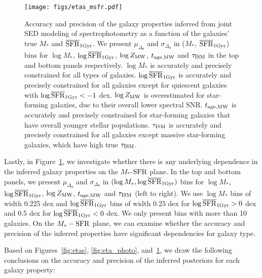 \begin{figure}
\begin{center}
    \texttt{[image: figs/etas\_msfr.pdf]} 
    \caption{
        Accuracy and precision of the galaxy properties inferred from joint SED
        modeling of spectrophotometry as a function of the galaxies' true $M_*$
        and $\overline{\rm SFR}_{\rm 1Gyr}$. 
        We present $\mu_{\Delta_{\theta}}$ and $\sigma_{\Delta_{\theta}}$ in
        ($M_*$, $\overline{\rm SFR}_{\rm 1Gyr}$) bins for $\log M_*$, $\log\overline{\rm SFR}_{\rm 1Gyr}$, $\log Z_{\rm
        MW}$, $t_{\rm age, MW}$ and $\tau_{\rm ISM}$ in the top and bottom
        panels respectively. 
        $\log M_*$ is accurately and precisely constrained for all types of galaxies. 
        $\log\overline{\rm SFR}_{\rm 1Gyr}$ is accurately and precisely constrained for all galaxies
        except for quiescent galaxies with $\log\overline{\rm SFR}_{\rm 1Gyr} < -1$ dex. 
        $\log Z_{\rm MW}$ is overestimated for star-forming galaxies, due to their
        overall lower spectral SNR. 
        $t_{\rm age, MW}$ is accurately and precisely constrained for star-forming
        galaxies that have overall younger stellar populations. 
        $\tau_{\rm ISM}$ is accurately and precisely constrained for all galaxies
        except massive star-forming galaxies, which have high true $\tau_{\rm ISM}$. 
    }\label{fig:etas_msfr}
\end{center}
\end{figure}

Lastly, in Figure~\ref{fig:etas_msfr}, we investigate whether there is any
underlying dependence in the inferred galaxy properties on the  
$M_*$-${\rm SFR}$ plane. 
In the top and bottom panels, we present $\mu_{\Delta_{\theta}}$ and 
$\sigma_{\Delta_{\theta}}$ in $(\log M_*, \log\overline{\rm SFR}_{\rm 1Gyr})$ bins for 
$\log M_*$, $\log\overline{\rm SFR}_{\rm 1Gyr}$, $\log Z_{\rm MW}$, $t_{\rm age, MW}$ and $\tau_{\rm ISM}$ (left to
right).
We use $\log M_*$ bins of width 0.225 dex and $\log\overline{\rm SFR}_{\rm 1Gyr}$ bins of width 
0.25 dex for $\log \overline{\rm SFR}_{\rm 1Gyr} > 0$ dex and 0.5 dex for $\log \overline{\rm SFR}_{\rm 1Gyr} < 0$ dex. 
We only present bins with more than 10 galaxies. 
On the $M_*-{\rm SFR}$ plane, we can examine whether the accuracy and precision
of the inferred properties have significant dependencies for galaxy type. 

Based on Figures~\ref{fig:etas}, \ref{fig:eta_photo}, and~\ref{fig:etas_msfr},
we draw the following conclusions on the accuracy and precision of the inferred
posteriors for each galaxy property:\\

